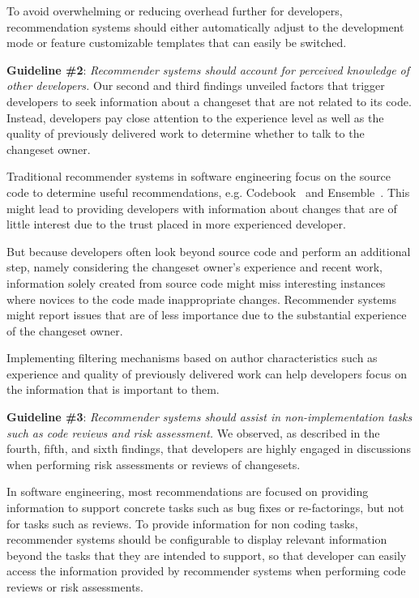To avoid overwhelming or reducing overhead further for developers, recommendation systems should either automatically adjust to the development mode or feature customizable templates that can easily be switched. 

\textbf{Guideline \#2}: \emph{Recommender systems should account for perceived knowledge of other developers.}
Our second and third findings unveiled factors that trigger developers to seek information about a changeset that are not related to its code. 
Instead, developers pay close attention to the experience level as well as the quality of previously delivered work to determine whether to talk to the changeset owner.

Traditional recommender systems in software engineering focus on the source code to determine useful recommendations, e.g. Codebook~\cite{begel:icse:2010} and Ensemble~\cite{xiang:rsse:2008}.
This might lead to providing developers with information about changes that are of little interest due to the trust placed in more experienced developer. 

But because developers often look beyond source code and perform an additional step, namely considering the changeset owner's experience and recent work, information solely created from source code might miss interesting instances where novices to the code made inappropriate changes.
Recommender systems might report issues that are of less importance due to the substantial experience of the changeset owner.

Implementing filtering mechanisms based on author characteristics such as experience and quality of previously delivered work can help developers focus on the information that is important to them.


\textbf{Guideline \#3}: \emph{Recommender systems should assist in non-implementation tasks such as code reviews and risk assessment.} 
We observed, as described in the fourth, fifth, and sixth findings, that developers are highly engaged in discussions when performing risk assessments or reviews of changesets. 

In software engineering, most recommendations are focused on providing information to support concrete tasks such as bug fixes or re-factorings, but not for tasks such as reviews. To provide information for non coding tasks, recommender systems should be configurable to display relevant information beyond the tasks that they are intended to support, so that developer can easily access the information provided by recommender systems when performing code reviews or risk assessments.

